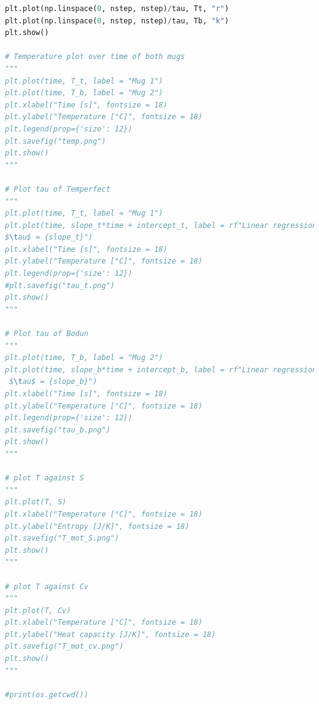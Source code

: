 \documentclass[reprint,english,notitlepage]{revtex4-2}
\begin{document}
\begin{lstlisting}[language=Python]
plt.plot(np.linspace(0, nstep, nstep)/tau, Tt, "r")
plt.plot(np.linspace(0, nstep, nstep)/tau, Tb, "k")
plt.show()

# Temperature plot over time of both mugs
"""
plt.plot(time, T_t, label = "Mug 1")
plt.plot(time, T_b, label = "Mug 2")
plt.xlabel("Time [s]", fontsize = 18)
plt.ylabel("Temperature [°C]", fontsize = 18)
plt.legend(prop={'size': 12})
plt.savefig("temp.png")
plt.show()
"""

# Plot tau of Temperfect
"""
plt.plot(time, T_t, label = "Mug 1")
plt.plot(time, slope_t*time + intercept_t, label = rf"Linear regression,
$\tau$ = {slope_t}")
plt.xlabel("Time [s]", fontsize = 18)
plt.ylabel("Temperature [°C]", fontsize = 18)
plt.legend(prop={'size': 12})
#plt.savefig("tau_t.png")
plt.show()
"""

# Plot tau of Bodun
"""
plt.plot(time, T_b, label = "Mug 2")
plt.plot(time, slope_b*time + intercept_b, label = rf"Linear regression,
 $\tau$ = {slope_b}")
plt.xlabel("Time [s]", fontsize = 18)
plt.ylabel("Temperature [°C]", fontsize = 18)
plt.legend(prop={'size': 12})
plt.savefig("tau_b.png")
plt.show()
"""

# plot T against S
"""
plt.plot(T, S)
plt.xlabel("Temperature [°C]", fontsize = 18)
plt.ylabel("Entropy [J/K]", fontsize = 18)
plt.savefig("T_mot_S.png")
plt.show()
"""

# plot T against Cv
"""
plt.plot(T, Cv)
plt.xlabel("Temperature [°C]", fontsize = 18)
plt.ylabel("Heat capacity [J/K]", fontsize = 18)
plt.savefig("T_mot_cv.png")
plt.show()
"""

#print(os.getcwd())
\end{lstlisting}
\end{document}
